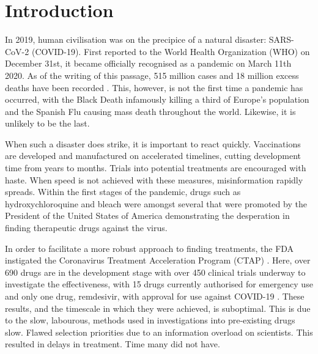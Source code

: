 
\chapter{Introduction}  %

\ifpdf
    \graphicspath{{Chapter1/Figs/Raster/}{Chapter1/Figs/PDF/}{Chapter1/Figs/}}
\else
    \graphicspath{{Chapter1/Figs/Vector/}{Chapter1/Figs/}}
\fi

In 2019, human civilisation was on the precipice of a natural disaster: \mbox{SARS-CoV-2} (\mbox{COVID-19}). First reported to the World Health Organization (WHO) on December 31st, it became officially recognised as a pandemic on March 11th 2020. As of the writing of this passage, 515 million cases and 18 million excess deaths have been recorded \cite{Wan22,WHO22}. This, however, is not the first time a pandemic has occurred, with the Black Death infamously killing a third of Europe's population and the Spanish Flu causing mass death throughout the world. Likewise, it is unlikely to be the last.

When such a disaster does strike, it is important to react quickly. Vaccinations are developed and manufactured on accelerated timelines, cutting development time from years to months. Trials into potential treatments are encouraged with haste. When speed is not achieved with these measures, misinformation rapidly spreads. Within the first stages of the pandemic, drugs such as hydroxychloroquine and bleach were amongst several that were promoted by the President of the United States of America demonstrating the desperation in finding therapeutic drugs against the virus.

In order to facilitate a more robust approach to finding treatments, the FDA instigated the Coronavirus Treatment Acceleration Program (CTAP) \cite{CTAP22}. Here, over 690 drugs are in the development stage with over 450 clinical trials underway to investigate the effectiveness, with 15 drugs currently authorised for emergency use and only one drug, remdesivir, with approval for use against \mbox{COVID-19} \cite{CTAP22}. These results, and the timescale in which they were achieved, is suboptimal. This is due to the slow, labourous, methods used in investigations into pre-existing drugs slow. Flawed selection priorities due to an information overload on scientists. This resulted in delays in treatment. Time many did not have.

